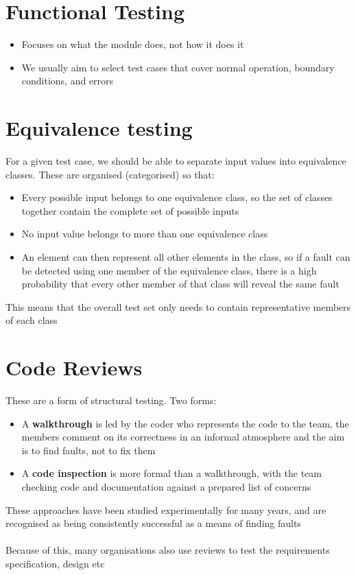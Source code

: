 \documentclass{article}[18pt]
\begin{document}
\section{Functional Testing}
\begin{itemize}
	\item Focuses on what the module does, not how it does it
	\item We usually aim to select test cases that cover normal operation, boundary conditions, and errors
\end{itemize}
\section{Equivalence testing}
For a given test case, we should be able to separate input values into equivalence classes. These are organised (categorised) so that:
\begin{itemize}
	\item Every possible input belongs to one equivalence class, so the set of classes together contain the complete set of possible inputs
	\item No input value belongs to more than one equivalence class
	\item An element can then represent all other elements in the class, so if a fault can be detected using one member of the equivalence class, there is a high probability that every other member of that class will reveal the same fault
\end{itemize}
This means that the overall test set only needs to contain representative members of each class
\section{Code Reviews}
These are a form of structural testing. Two forms:
\begin{itemize}
	\item A \textbf{walkthrough} is led by the coder who represents the code to the team, the members comment on its correctness in an informal atmosphere and the aim is to find faults, not to fix them
	\item A \textbf{code inspection} is more formal than a walkthrough, with the team checking code and documentation against a prepared list of concerns
\end{itemize}
These approaches have been studied experimentally for many years, and are recognised as being consistently successful as a means of finding faults\\
\\
Because of this, many organisations also use reviews to test the requirements specification, design etc
\end{document}
